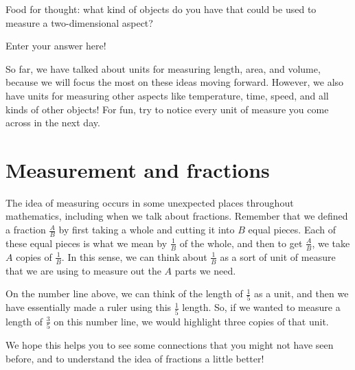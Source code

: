 \documentclass{ximera}
\begin{document}
\begin{question}
Food for thought: what kind of objects do you have that could be used to measure a two-dimensional aspect?
\begin{freeResponse}
Enter your answer here!
\end{freeResponse}
\end{question}

So far, we have talked about units for measuring length, area, and volume, because we will focus the most on these ideas moving forward. However, we also have units for measuring other aspects like temperature, time, speed, and all kinds of other objects! For fun, try to notice every unit of measure you come across in the next day.

\section{Measurement and fractions}
The idea of measuring occurs in some unexpected places throughout mathematics, including when we talk about fractions. Remember that we defined a fraction $\frac{A}{B}$ by first taking a whole and cutting it into $B$ equal pieces. Each of these equal pieces is what we mean by $\frac{1}{B}$ of the whole, and then to get $\frac{A}{B}$, we take $A$ copies of $\frac{1}{B}$. In this sense, we can think about $\frac{1}{B}$ as a sort of unit of measure that we are using to measure out the $A$ parts we need.
\begin{center}
\end{center}
On the number line above, we can think of the length of $\frac{1}{5}$ as a unit, and then we have essentially made a ruler using this $\frac{1}{5}$ length. So, if we wanted to measure a length of $\frac{3}{5}$ on this number line, we would highlight three copies of that unit.

\begin{center}
\end{center}

We hope this helps you to see some connections that you might not have seen before, and to understand the idea of fractions a little better!
\end{document}
